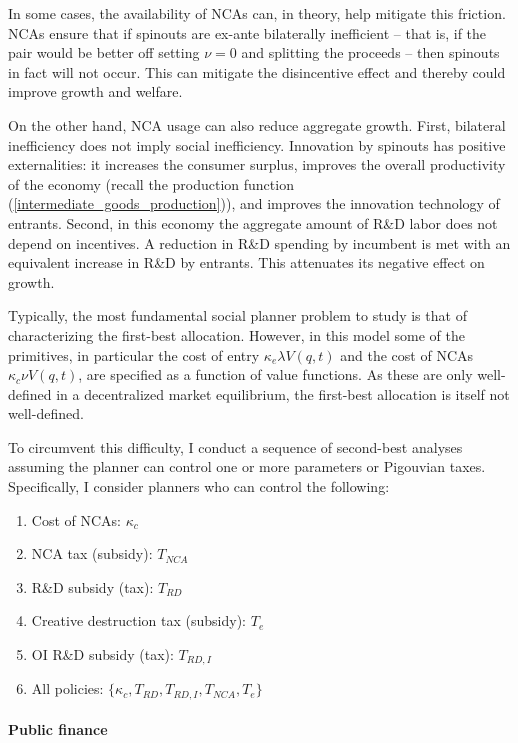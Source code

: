 \documentclass[11pt,english]{article}
\theoremstyle{remark}
\begin{document}
In some cases, the availability of NCAs can, in theory, help mitigate this friction. NCAs ensure that if spinouts are ex-ante bilaterally inefficient -- that is, if the pair would be better off setting $\nu = 0$ and splitting the proceeds -- then spinouts in fact will not occur. This can mitigate the disincentive effect and thereby could improve growth and welfare. 

On the other hand, NCA usage can also reduce aggregate growth. First, bilateral inefficiency does not imply social inefficiency. Innovation by spinouts has positive externalities: it increases the consumer surplus, improves the overall productivity of the economy (recall the production function (\ref{intermediate_goods_production})), and improves the innovation technology of entrants. Second, in this economy the aggregate amount of R\&D labor does not depend on incentives. A reduction in R\&D spending by incumbent is met with an equivalent increase in R\&D by entrants. This attenuates its negative effect on growth. 

Typically, the most fundamental social planner problem to study is that of characterizing the first-best allocation. However, in this model some of the primitives, in particular the cost of entry $\kappa_e \lambda V(q,t)$ and the cost of NCAs $\kappa_c \nu V(q,t)$, are specified as a function of value functions. As these are only well-defined in a decentralized market equilibrium, the first-best allocation is itself not well-defined.

To circumvent this difficulty, I conduct a sequence of second-best analyses assuming the planner can control one or more parameters or Pigouvian taxes. Specifically, I consider planners who can control the following: 

\begin{enumerate}
	\item Cost of NCAs: $\kappa_c$ 
	\item NCA tax (subsidy): $T_{NCA}$
	\item R\&D subsidy (tax): $T_{RD}$
	\item Creative destruction tax (subsidy): $T_e$
	\item OI R\&D subsidy (tax): $T_{RD,I}$
	\item All policies: $\{\kappa_c, T_{RD}, T_{RD,I}, T_{NCA}, T_e\}$
\end{enumerate}

\paragraph{Public finance} 
\end{document}
